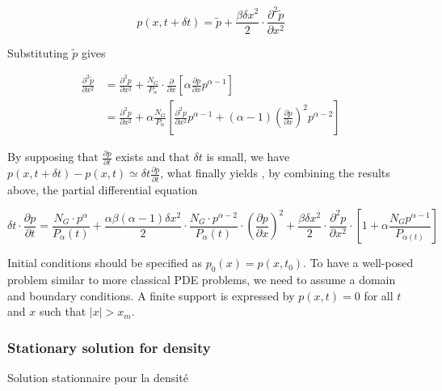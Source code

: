 \[
p(x,t+\delta t) = \tilde{p} + \frac{\beta \delta x^2}{2} \cdot \frac{\partial^2 \tilde{p}}{\partial x^2}
\]

Substituting $\tilde{p}$ gives

\[
\begin{split}
\frac{\partial^2 \tilde{p}}{\partial x^2} & = \frac{\partial^2 p}{\partial x^2} + \frac{N_G}{P_\alpha}\cdot \frac{\partial}{\partial x}\left[\alpha \frac{\partial p}{\partial x} p^{\alpha - 1}\right]\\
& = \frac{\partial^2 p}{\partial x^2} + \alpha \frac{N_G}{P_\alpha} \left[\frac{\partial^2 p}{\partial x^2} p^{\alpha - 1} + (\alpha - 1) \left( \frac{\partial p}{\partial x}\right)^2 p^{\alpha - 2}\right]
\end{split}
\]

By supposing that $\frac{\partial p}{\partial t}$ exists and that $\delta t$ is small, we have $p(x,t+\delta t) - p(x,t) \simeq \delta t\frac{\partial p}{\partial t}$, what finally yields , by combining the results above, the partial differential equation


\begin{equation}\label{eq:pde}
\delta t \cdot \frac{\partial p}{\partial t} = \frac{N_G \cdot p^{\alpha}}{P_{\alpha}(t)} + \frac{\alpha \beta (\alpha - 1) \delta x^2}{2}\cdot \frac{N_G \cdot p^{\alpha-2}}{P_{\alpha}(t)} \cdot \left(\frac{\partial p}{\partial x}\right)^2 + \frac{\beta \delta x^2}{2} \cdot \frac{\partial^2 p}{\partial x^2} \cdot\left[ 1 + \alpha \frac{N_G p^{\alpha - 1}}{P_{\alpha(t)}} \right]
\end{equation}



Initial conditions should be specified as $p_0(x) = p(x,t_0)$. To have a well-posed problem similar to more classical PDE problems, we need to assume a domain and boundary conditions. A finite support is expressed by $p(x,t)=0$ for all $t$ and $x$ such that $\left|x\right|>x_m$.



\subsubsection{Stationary solution for density}{Solution stationnaire pour la densité}

